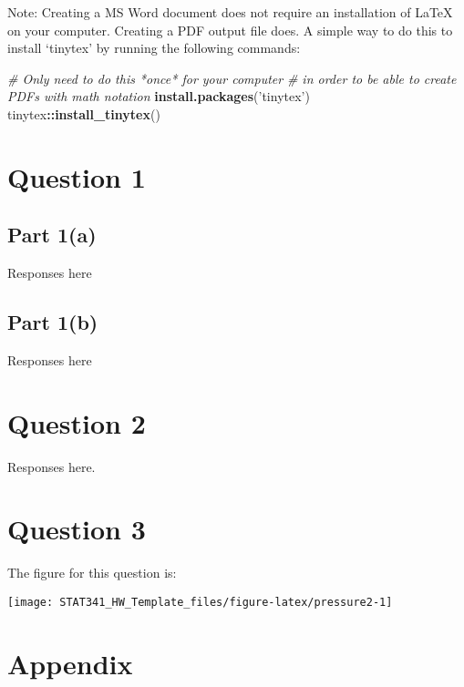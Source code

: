 \documentclass[]{article}
\newenvironment{Shaded}{\begin{snugshade}}{\end{snugshade}}
\newcommand{\KeywordTok}[1]{\textcolor[rgb]{0.13,0.29,0.53}{\textbf{#1}}}
\newcommand{\StringTok}[1]{\textcolor[rgb]{0.31,0.60,0.02}{#1}}
\newcommand{\CommentTok}[1]{\textcolor[rgb]{0.56,0.35,0.01}{\textit{#1}}}
\newcommand{\OperatorTok}[1]{\textcolor[rgb]{0.81,0.36,0.00}{\textbf{#1}}}
\newcommand{\NormalTok}[1]{#1}
\begin{document}
Note: Creating a MS Word document does not require an installation of
LaTeX on your computer. Creating a PDF output file does. A simple way to
do this to install `tinytex' by running the following commands:

\begin{Shaded}
\begin{Highlighting}[]
\CommentTok{# Only need to do this *once* for your computer}
\CommentTok{# in order to be able to create PDFs with math notation}
\KeywordTok{install.packages}\NormalTok{(}\StringTok{'tinytex'}\NormalTok{)}
\NormalTok{tinytex}\OperatorTok{::}\KeywordTok{install_tinytex}\NormalTok{()}
\end{Highlighting}
\end{Shaded}

\section{Question 1}\label{question-1}

\subsection{Part 1(a)}\label{part-1a}

Responses here

\subsection{Part 1(b)}\label{part-1b}

Responses here

\section{Question 2}\label{question-2}

Responses here.

\section{Question 3}\label{question-3}

The figure for this question is:

\texttt{[image: STAT341\_HW\_Template\_files/figure-latex/pressure2-1]}

\section{Appendix}\label{appendix}
\end{document}
